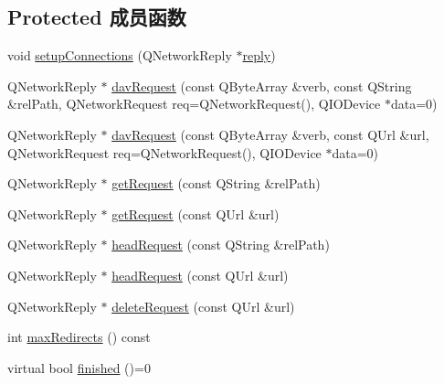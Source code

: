 \subsection*{Protected 成员函数}
\begin{DoxyCompactItemize}
\item 
void \hyperlink{class_o_c_c_1_1_abstract_network_job_a9672b89c5b77fbd67ad2a00b85ae1df2}{setup\+Connections} (Q\+Network\+Reply $\ast$\hyperlink{class_o_c_c_1_1_abstract_network_job_a38ee84a458ae0792e5bc01e57a59259b}{reply})
\item 
Q\+Network\+Reply $\ast$ \hyperlink{class_o_c_c_1_1_abstract_network_job_a5c0f7fcc4db68299f376aeb7573bf207}{dav\+Request} (const Q\+Byte\+Array \&verb, const Q\+String \&rel\+Path, Q\+Network\+Request req=Q\+Network\+Request(), Q\+I\+O\+Device $\ast$data=0)
\item 
Q\+Network\+Reply $\ast$ \hyperlink{class_o_c_c_1_1_abstract_network_job_a3110a1a51bb94c92449d758e0f9285bd}{dav\+Request} (const Q\+Byte\+Array \&verb, const Q\+Url \&url, Q\+Network\+Request req=Q\+Network\+Request(), Q\+I\+O\+Device $\ast$data=0)
\item 
Q\+Network\+Reply $\ast$ \hyperlink{class_o_c_c_1_1_abstract_network_job_a2385aca6cd2090383403ec154b663806}{get\+Request} (const Q\+String \&rel\+Path)
\item 
Q\+Network\+Reply $\ast$ \hyperlink{class_o_c_c_1_1_abstract_network_job_a439fa1b129d82b4f9cd5c3913738ed85}{get\+Request} (const Q\+Url \&url)
\item 
Q\+Network\+Reply $\ast$ \hyperlink{class_o_c_c_1_1_abstract_network_job_aaacbf0ebfb042d9ec34694cbdcca00b8}{head\+Request} (const Q\+String \&rel\+Path)
\item 
Q\+Network\+Reply $\ast$ \hyperlink{class_o_c_c_1_1_abstract_network_job_a79faba21de3d7176233b63d986ab52f7}{head\+Request} (const Q\+Url \&url)
\item 
Q\+Network\+Reply $\ast$ \hyperlink{class_o_c_c_1_1_abstract_network_job_ab1d23aa2b82cf666a6f629863f487a92}{delete\+Request} (const Q\+Url \&url)
\item 
int \hyperlink{class_o_c_c_1_1_abstract_network_job_ad58fa4ab85f5c3a4dff1fd6e406b64a0}{max\+Redirects} () const
\item 
virtual bool \hyperlink{class_o_c_c_1_1_abstract_network_job_af811f7299d7e526678a8758f2e7102d2}{finished} ()=0
\end{DoxyCompactItemize}
